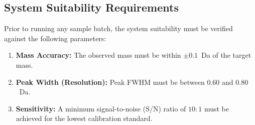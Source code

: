 \subsection{System Suitability Requirements}
Prior to running any sample batch, the system suitability must be verified against the following parameters:
\begin{enumerate}
    \item \textbf{Mass Accuracy:} The observed mass must be within $\pm 0.1$~Da of the target mass.
    \item \textbf{Peak Width (Resolution):} Peak FWHM must be between $0.60$ and $0.80$~Da.
    \item \textbf{Sensitivity:} A minimum signal-to-noise (S/N) ratio of $10:1$ must be achieved for the lowest calibration standard.
\end{enumerate}

